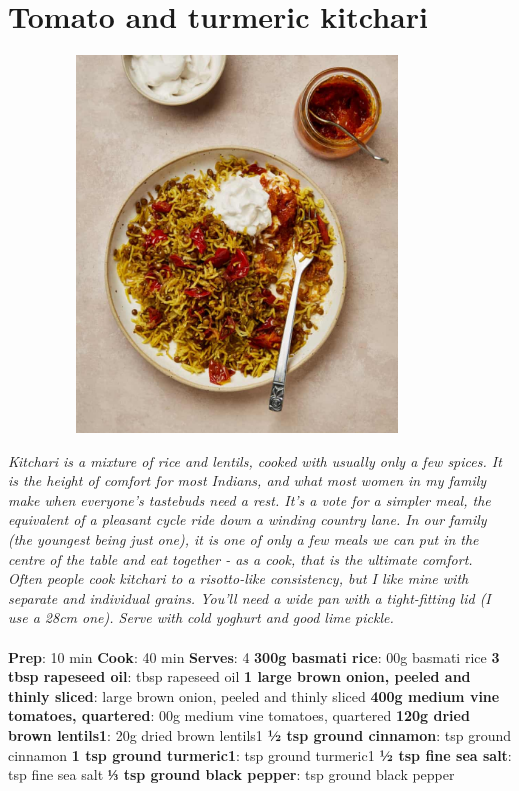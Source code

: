 \documentclass{book}
\begin{document}
\section{Tomato and turmeric kitchari}
\begin{figure}
\centering\includegraphics[width=10cm,height=10cm,keepaspectratio]{Recipe_Pictures/Tomato_and_turmeric_kitchari.png}
\end{figure}
\emph{Kitchari is a mixture of rice and lentils, cooked with usually only a few spices. It is the height of comfort for most Indians, and what most women in my family make when everyone’s tastebuds need a rest. It’s a vote for a simpler meal, the equivalent of a pleasant cycle ride down a winding country lane. In our family (the youngest being just one), it is one of only a few meals we can put in the centre of the table and eat together - as a cook, that is the ultimate comfort.\\ 
Often people cook kitchari to a risotto-like consistency, but I like mine with separate and individual grains. You’ll need a wide pan with a tight-fitting lid (I use a 28cm one). Serve with cold yoghurt and good lime pickle.}\\\\ 
\textbf{Prep}: 10 min
\textbf{Cook}: 40 min
\textbf{Serves}: 4
\textbf{300g basmati rice}: 00g basmati rice
\textbf{3 tbsp rapeseed oil}:  tbsp rapeseed oil
\textbf{1 large brown onion, peeled and thinly sliced}:  large brown onion, peeled and thinly sliced
\textbf{400g medium vine tomatoes, quartered}: 00g medium vine tomatoes, quartered
\textbf{120g dried brown lentils1}: 20g dried brown lentils1
\textbf{½ tsp ground cinnamon}:  tsp ground cinnamon
\textbf{1 tsp ground turmeric1}:  tsp ground turmeric1
\textbf{½ tsp fine sea salt}:  tsp fine sea salt
\textbf{⅓ tsp ground black pepper}:  tsp ground black pepper
\end{document}
